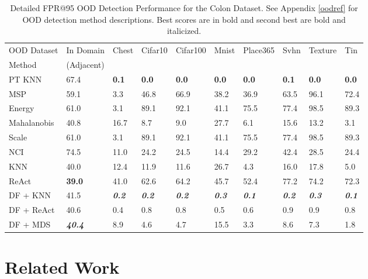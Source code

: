 \documentclass[letterpaper]{article} %
\theoremstyle{plain}
\theoremstyle{definition}
\theoremstyle{remark}
\begin{document}
\begin{table}
\centering
\caption{Detailed FPR@95 OOD Detection Performance for the Colon Dataset. See Appendix \ref{oodref} for OOD detection method descriptions. Best scores are in bold and second best are bold and italicized.}
\label{tab:fprcolon}
\begin{tabular}{llllllllll}
\toprule
OOD Dataset & In Domain  & Chest & Cifar10 & Cifar100 & Mnist & Place365 & Svhn & Texture & Tin \\
Method &  (Adjacent) &  &  &  &  &  &  &  &  \\
\midrule
PT KNN & 67.4 & \textbf{0.1} & \textbf{0.0} & \textbf{0.0} & \textbf{0.0} & \textbf{0.0} & \textbf{0.1} & \textbf{0.0} & \textbf{0.0} \\
MSP & 59.1 & 3.3 & 46.8 & 66.9 & 38.2 & 36.9 & 63.5 & 96.1 & 72.4 \\
Energy & 61.0 & 3.1 & 89.1 & 92.1 & 41.1 & 75.5 & 77.4 & 98.5 & 89.3 \\
Mahalanobis & 40.8 & 16.7 & 8.7 & 9.0 & 27.7 & 6.1 & 15.6 & 13.2 & 3.1 \\
Scale & 61.0 & 3.1 & 89.1 & 92.1 & 41.1 & 75.5 & 77.4 & 98.5 & 89.3 \\
NCI & 74.5 & 11.0 & 24.2 & 24.5 & 14.4 & 29.2 & 42.4 & 28.5 & 24.4 \\
KNN & 40.0 & 12.4 & 11.9 & 11.6 & 26.7 & 4.3 & 16.0 & 17.8 & 5.0 \\
ReAct & \textbf{39.0} & 41.0 & 62.6 & 64.2 & 45.7 & 52.4 & 77.2 & 74.2 & 72.3 \\
DF + KNN & 41.5 & \textbf{\textit{0.2}} & \textbf{\textit{0.2}} & \textbf{\textit{0.2}} & \textbf{\textit{0.3}} & \textbf{\textit{0.1}} & \textbf{\textit{0.2}} & \textbf{\textit{0.3}} & \textbf{\textit{0.1}} \\
DF + ReAct & 40.6 & 0.4 & 0.8 & 0.8 & 0.5 & 0.6 & 0.9 & 0.9 & 0.8 \\
DF + MDS & \textbf{\textit{40.4}} & 8.9 & 4.6 & 4.7 & 15.5 & 3.3 & 8.6 & 7.3 & 1.8 \\
\bottomrule
\end{tabular}
\end{table}

\section{Related Work}
\label{sec:related_work}
 
\end{document}
